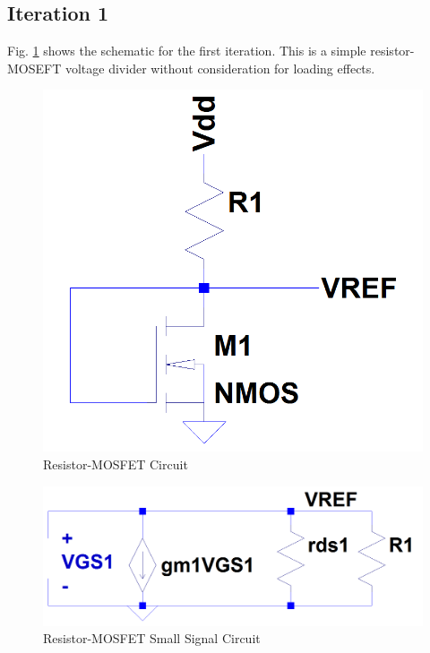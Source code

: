 \documentclass[conference]{IEEEtran}
\begin{document}
\subsection{Iteration 1}
Fig. \ref{fig:resistor-mosfet1} shows the schematic for the first iteration.  This is a simple resistor-MOSEFT voltage divider without consideration for loading effects.
\begin{figure}[!htbp]
  \centering
  \includegraphics[scale=0.25]{images/resistor-mosfet1.png}
  \caption[resistor1]{Resistor-MOSFET Circuit}
  \label{fig:resistor-mosfet1}
\end{figure}
\begin{figure}[!htbp]
  \centering
  \includegraphics[scale=0.25]{images/resistor-mosfet1-ss.png}
  \caption[resistor1-ss]{Resistor-MOSFET Small Signal Circuit}
  \label{fig:resistor-mosfet1-ss}
\end{figure}
\end{document}
